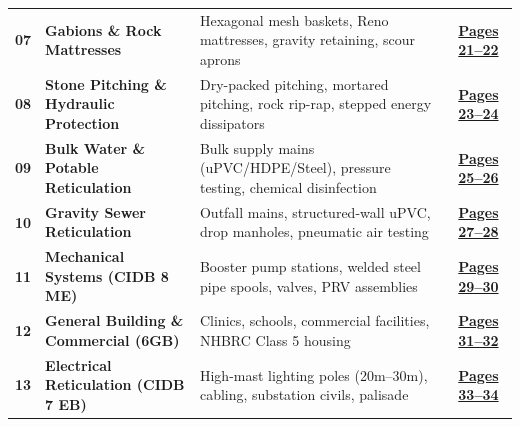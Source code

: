 \begin{tabularx}{\textwidth}{@{}l p{4.2cm} X c@{}}
\rowcolor{mhbluelight}
\fontsize{7.5pt}{9.0pt}\selectfont\bfseries 07 & \fontsize{7.5pt}{9.0pt}\selectfont\bfseries Gabions \& Rock Mattresses & \fontsize{7.5pt}{9.0pt}\selectfont Hexagonal mesh baskets, Reno mattresses, gravity retaining, scour aprons & \fontsize{7.5pt}{9.0pt}\selectfont\hyperlink{sec:gabions}{\bfseries\color{mhblue}Pages 21--22} \\
\fontsize{7.5pt}{9.0pt}\selectfont\bfseries 08 & \fontsize{7.5pt}{9.0pt}\selectfont\bfseries Stone Pitching \& Hydraulic Protection & \fontsize{7.5pt}{9.0pt}\selectfont Dry-packed pitching, mortared pitching, rock rip-rap, stepped energy dissipators & \fontsize{7.5pt}{9.0pt}\selectfont\hyperlink{sec:pitching}{\bfseries\color{mhblue}Pages 23--24} \\
\rowcolor{mhbluelight}
\fontsize{7.5pt}{9.0pt}\selectfont\bfseries 09 & \fontsize{7.5pt}{9.0pt}\selectfont\bfseries Bulk Water \& Potable Reticulation & \fontsize{7.5pt}{9.0pt}\selectfont Bulk supply mains (uPVC/HDPE/Steel), pressure testing, chemical disinfection & \fontsize{7.5pt}{9.0pt}\selectfont\hyperlink{sec:waterretic}{\bfseries\color{mhblue}Pages 25--26} \\
\fontsize{7.5pt}{9.0pt}\selectfont\bfseries 10 & \fontsize{7.5pt}{9.0pt}\selectfont\bfseries Gravity Sewer Reticulation & \fontsize{7.5pt}{9.0pt}\selectfont Outfall mains, structured-wall uPVC, drop manholes, pneumatic air testing & \fontsize{7.5pt}{9.0pt}\selectfont\hyperlink{sec:sewer}{\bfseries\color{mhblue}Pages 27--28} \\
\rowcolor{mhbluelight}
\fontsize{7.5pt}{9.0pt}\selectfont\bfseries 11 & \fontsize{7.5pt}{9.0pt}\selectfont\bfseries Mechanical Systems (CIDB 8 ME) & \fontsize{7.5pt}{9.0pt}\selectfont Booster pump stations, welded steel pipe spools, valves, PRV assemblies & \fontsize{7.5pt}{9.0pt}\selectfont\hyperlink{sec:mechanical}{\bfseries\color{mhblue}Pages 29--30} \\
\fontsize{7.5pt}{9.0pt}\selectfont\bfseries 12 & \fontsize{7.5pt}{9.0pt}\selectfont\bfseries General Building \& Commercial (6GB) & \fontsize{7.5pt}{9.0pt}\selectfont Clinics, schools, commercial facilities, NHBRC Class 5 housing & \fontsize{7.5pt}{9.0pt}\selectfont\hyperlink{sec:building}{\bfseries\color{mhblue}Pages 31--32} \\
\rowcolor{mhbluelight}
\fontsize{7.5pt}{9.0pt}\selectfont\bfseries 13 & \fontsize{7.5pt}{9.0pt}\selectfont\bfseries Electrical Reticulation (CIDB 7 EB) & \fontsize{7.5pt}{9.0pt}\selectfont High-mast lighting poles (20m--30m), cabling, substation civils, palisade & \fontsize{7.5pt}{9.0pt}\selectfont\hyperlink{sec:electrical}{\bfseries\color{mhblue}Pages 33--34} \\
\end{tabularx}
\renewcommand{\arraystretch}{1}

